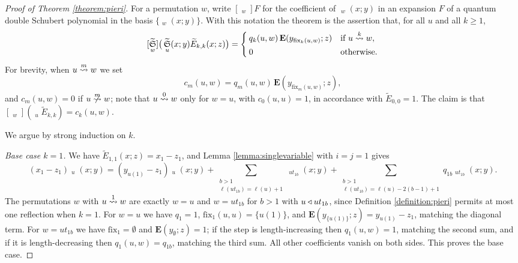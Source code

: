 \documentclass{amsart}
\theoremstyle{definition}
\theoremstyle{remark}
\numberwithin{equation}{section}
\DeclareMathOperator{\qsch}{\widetilde{\mathfrak{S}}}
\newcommand{\xrightsquigarrow}[2][]{%
	\mathrel{\mathop{\rightsquigarrow}\limits^{\scriptstyle #2}%
	\ifx\hfuzz#1\hfuzz\else_{\scriptstyle #1}\fi}%
}
\newcommand{\tom}[1]{\ensuremath{\xrightsquigarrow{#1}}}
\newcommand{\fx}{\mathrm{fix}}
\newcommand{\wte}{\mathbf{E}}
\newcommand{\qelem}{\widetilde{E}}
\begin{document}
\begin{proof}[Proof of Theorem \ref{theorem:pieri}]
For a permutation $w$, write $[\qsch_w]F$ for the coefficient of $\qsch_w(x;y)$ in an expansion $F$ of a quantum double Schubert polynomial in the basis $\{\qsch_w(x;y)\}$. With this notation the theorem is the assertion that, for all $u$ and all $k\geq1$,
$$[\qsch_w]\big(\qsch_u(x;y)\qelem_{k,k}(x;z)\big)=\begin{cases}q_k(u,w)\,\wte(y_{\fx_{k}(u,w)};z) & \text{if }u\tom{k} w,\\[2pt] 0 & \text{otherwise.}\end{cases}$$
For brevity, when $u\tom{m} w$ we set
$$c_m(u,w)=q_m(u,w)\,\wte(y_{\fx_{m}(u,w)};z),$$
and $c_m(u,w)=0$ if $u\ntom{m}w$; note that $u\tom{0}w$ only for $w=u$, with $c_0(u,u)=1$, in accordance with $\qelem_{0,0}=1$. The claim is that $[\qsch_w](\qsch_u\qelem_{k,k})=c_k(u,w)$.

We argue by strong induction on $k$.

\emph{Base case $k=1$.} We have $\qelem_{1,1}(x;z)=x_1-z_1$, and Lemma \ref{lemma:singlevariable} with $i=j=1$ gives
$$(x_1-z_1)\qsch_u(x;y)=(y_{u(1)}-z_1)\qsch_u(x;y)+\sum_{\substack{b>1\\\ell(ut_{1b})=\ell(u)+1}}\qsch_{ut_{1b}}(x;y)+\sum_{\substack{b>1\\\ell(ut_{1b})=\ell(u)-2(b-1)+1}}q_{1b}\qsch_{ut_{1b}}(x;y).$$
The permutations $w$ with $u\tom{1}w$ are exactly $w=u$ and $w=ut_{1b}$ for $b>1$ with $u\triangleleft ut_{1b}$, since Definition \ref{definition:pieri} permits at most one reflection when $k=1$. For $w=u$ we have $q_1=1$, $\fx_{1}(u,u)=\{u(1)\}$, and $\wte(y_{\{u(1)\}};z)=y_{u(1)}-z_1$, matching the diagonal term. For $w=ut_{1b}$ we have $\fx_{1}=\emptyset$ and $\wte(y_\emptyset;z)=1$; if the step is length-increasing then $q_1(u,w)=1$, matching the second sum, and if it is length-decreasing then $q_1(u,w)=q_{1b}$, matching the third sum. All other coefficients vanish on both sides. This proves the base case.


\end{proof}
\end{document}
